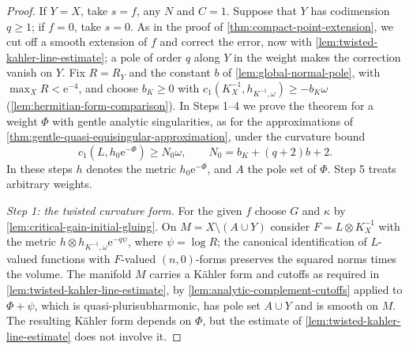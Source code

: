 \begin{proof}
If $Y=X$, take $s=f$, any $N$ and $C=1$. Suppose that $Y$ has codimension $q\geq1$; if $f=0$, take $s=0$. As in the proof of \cref{thm:compact-point-extension}, we cut off a smooth extension of $f$ and correct the error, now with \cref{lem:twisted-kahler-line-estimate}; a pole of order $q$ along $Y$ in the weight makes the correction vanish on $Y$. Fix $R=R_Y$ and the constant $b$ of \cref{lem:global-normal-pole}, with $\max_XR<\mathrm e^{-4}$, and choose $b_K\geq0$ with $c_1(K_X^{-1},h_{K^{-1},\omega})\geq-b_K\omega$ (\cref{lem:hermitian-form-comparison}). In Steps 1--4 we prove the theorem for a weight $\Phi$ with gentle analytic singularities, as for the approximations of \cref{thm:gentle-quasi-equisingular-approximation}, under the curvature bound
\[
 c_1(L,h_0\mathrm e^{-\Phi})\geq N_0\omega,
 \qquad N_0=b_K+(q+2)b+2.
\]
In these steps $h$ denotes the metric $h_0\mathrm e^{-\Phi}$, and $A$ the pole set of $\Phi$. Step 5 treats arbitrary weights.

\emph{Step 1: the twisted curvature form.} For the given $f$ choose $G$ and $\kappa$ by \cref{lem:critical-gain-initial-gluing}. On $M=X\setminus(A\cup Y)$ consider $F=L\otimes K_X^{-1}$ with the metric $h\otimes h_{K^{-1},\omega}\mathrm e^{-q\psi}$, where $\psi=\log R$; the canonical identification of $L$-valued functions with $F$-valued $(n,0)$-forms preserves the squared norms times the volume. The manifold $M$ carries a K\"ahler form and cutoffs as required in \cref{lem:twisted-kahler-line-estimate}, by \cref{lem:analytic-complement-cutoffs} applied to $\Phi+\psi$, which is quasi-plurisubharmonic, has pole set $A\cup Y$ and is smooth on $M$. The resulting K\"ahler form depends on $\Phi$, but the estimate of \cref{lem:twisted-kahler-line-estimate} does not involve it.


\end{proof}
